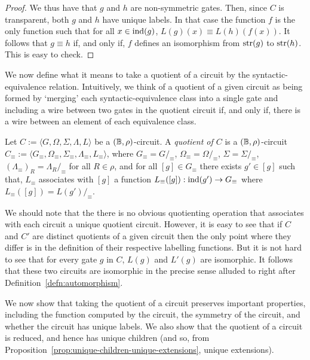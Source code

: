 \documentclass[../main/thesis.tex]{subfiles}
\begin{document}
\begin{proof}
  We thus have that $g$ and $h$ are non-symmetric gates. Then, since $C$ is
  transparent, both $g$ and $h$ have unique labels. In that case the function
  $f$ is the only function such that for all $x \in \text{\upshape ind}(g)$, $L(g)(x) \equiv
  L(h)(f(x))$. It follows that $g \equiv h$ if, and only if, $f$ defines an
  isomorphism from $\text{str}(g)$ to $\text{str}(h)$. This is easy to check.
\end{proof}

We now define what it means to take a quotient of a circuit by the
syntactic-equivalence relation. Intuitively, we think of a quotient of a given
circuit as being formed by `merging' each syntactic-equivalence class into a
single gate and including a wire between two gates in the quotient circuit if,
and only if, there is a wire between an element of each equivalence class.

\begin{definition}
  Let $C := \langle G, \Omega, \Sigma, \Lambda, L \rangle$ be a $(\mathbb{B},
  \rho)$-circuit. A \emph{quotient of $C$} is a $(\mathbb{B}, \rho)$-circuit $C_\equiv
  := \langle G_\equiv , \Omega_\equiv, \Sigma_\equiv , \Lambda_\equiv, L_\equiv
  \rangle$, where $G_\equiv = G /_\equiv$, $\Omega_\equiv = \Omega /_\equiv$,
  $\Sigma = \Sigma /_\equiv$, $(\Lambda_\equiv)_R = \Lambda_R /_\equiv$ for all
  $R \in \rho$, and for all $[g] \in G_\equiv$ there exists $g' \in [g]$ such
  that, $L_\equiv$ associates with $[g]$ a function $L_\equiv([g]) : \text{\upshape ind}(g')
  \rightarrow G_\equiv$ where $L_\equiv([g]) = L(g')/_\equiv$.
\end{definition}

We should note that the there is no obvious quotienting operation that
associates with each circuit a unique quotient circuit. However, it is easy to
see that if $C$ and $C'$ are distinct quotients of a given circuit then the only
point where they differ is in the definition of their respective labelling
functions. But it is not hard to see that for every gate $g$ in $C$, $L(g)$ and
$L'(g)$ are isomorphic. It follows that these two circuits are isomorphic in the
precise sense alluded to right after Definition~\ref{defn:automorphism}.

We now show that taking the quotient of a circuit preserves important
properties, including the function computed by the circuit, the symmetry of the
circuit, and whether the circuit has unique labels. We also show that the
quotient of a circuit is reduced, and hence has unique children (and so, from
Proposition~\ref{prop:unique-children-unique-extensions}, unique extensions).
\end{document}
